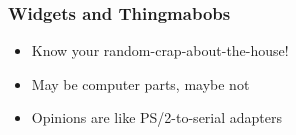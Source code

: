 \begin{frame}
 \frametitle{Widgets and Thingmabobs}

	\begin{itemize}
		\item Know your random-crap-about-the-house!
		\item May be computer parts, maybe not
        \item Opinions are like PS/2-to-serial adapters
	\end{itemize}
\end{frame}



\witqend
